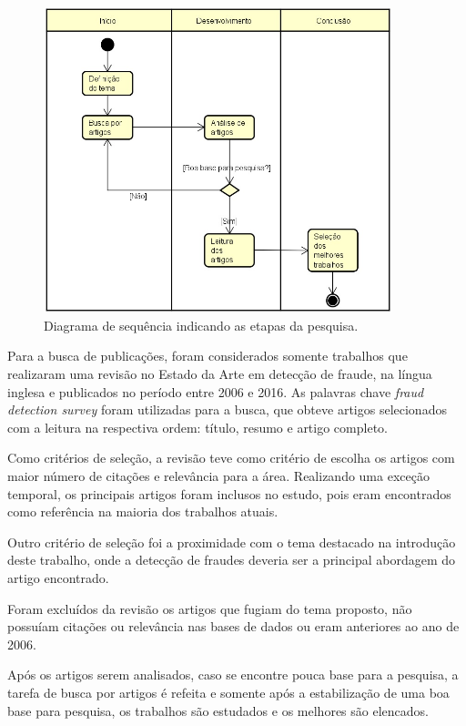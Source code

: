 \documentclass[smallextended]{svjour3}       %
\begin{document}
\begin{figure}[!ht]
	\centering
	\includegraphics[width=0.9\textwidth]{imagens/diagrama.jpg}
	\caption{Diagrama de sequência indicando as etapas da pesquisa.}
	\label{fig:diagrama}
\end{figure}

Para a busca de publicações, foram considerados somente trabalhos que realizaram uma revisão no Estado da Arte em detecção de fraude, na língua inglesa e publicados no período entre 2006 e 2016. As palavras chave \emph{fraud detection survey} foram utilizadas para a busca, que obteve artigos selecionados com a leitura na respectiva ordem: título, resumo e artigo completo. 

Como critérios de seleção, a revisão teve como critério de escolha os artigos com maior número de citações e relevância para a área. Realizando uma exceção temporal, os principais artigos foram inclusos no estudo, pois eram encontrados como referência na maioria dos trabalhos atuais.

Outro critério de seleção foi a proximidade com o tema destacado na introdução deste trabalho, onde a detecção de fraudes deveria ser a principal abordagem do artigo encontrado.

Foram excluídos da revisão os artigos que fugiam do tema proposto, não possuíam citações ou relevância nas bases de dados ou eram anteriores ao ano de 2006.

Após os artigos serem analisados, caso se encontre pouca base para a pesquisa, a tarefa de busca por artigos é refeita e somente após a estabilização de uma boa base para pesquisa, os trabalhos são estudados e os melhores são elencados.
\end{document}

